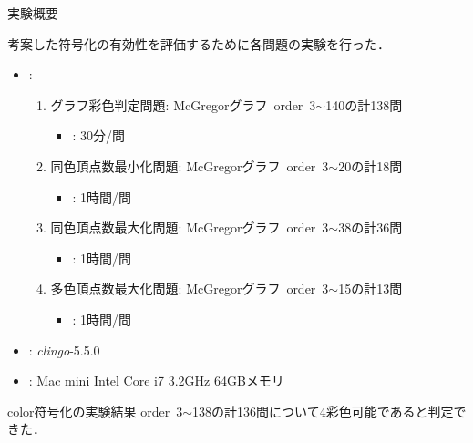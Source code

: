 \documentclass[dvipdfmx,11pt]{beamer}
\begin{document}
\begin{frame}{実験概要}
 \begin{block}{}
  考案した符号化の有効性を評価するために各問題の実験を行った．
 \end{block}

\begin{itemize}
 \item {}:
       \begin{enumerate}
        \item グラフ彩色判定問題: McGregorグラフ~order~3$\sim$140の計138問
              \begin{itemize}
               \item {}: 30分/問
              \end{itemize}
        \item 同色頂点数最小化問題: McGregorグラフ~order~3$\sim$20の計18問
              \begin{itemize}
               \item {}: 1時間/問
              \end{itemize}
        \item 同色頂点数最大化問題: McGregorグラフ~order~3$\sim$38の計36問
              \begin{itemize}
               \item {}: 1時間/問
              \end{itemize}
        \item 多色頂点数最大化問題: McGregorグラフ~order~3$\sim$15の計13問
              \begin{itemize}
               \item {}: 1時間/問
              \end{itemize}
       \end{enumerate}
 \item {}: \textit{clingo}-5.5.0
 \item {}: Mac mini Intel Core i7 3.2GHz 64GBメモリ
\end{itemize}  

 \begin{alertblock}{color符号化の実験結果}
  order~3$\sim$138の計136問について4彩色可能であると判定できた．
 \end{alertblock}
 
\end{frame}

\end{document}
